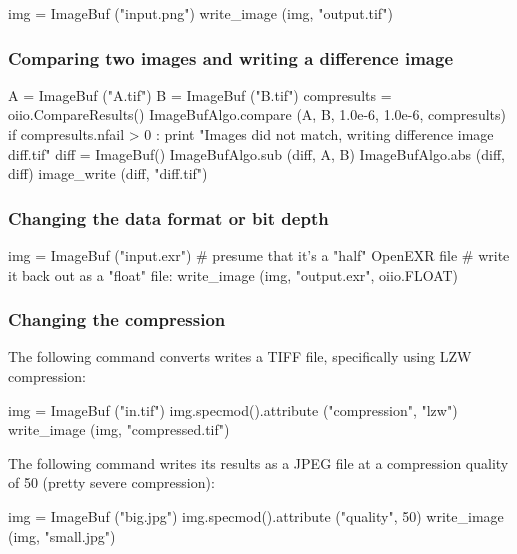 \begin{code}
    img = ImageBuf ("input.png")
    write_image (img, "output.tif")
\end{code}


\subsubsection*{Comparing two images and writing a difference image}

\begin{code}
    A = ImageBuf ("A.tif")
    B = ImageBuf ("B.tif")
    compresults = oiio.CompareResults()
    ImageBufAlgo.compare (A, B, 1.0e-6, 1.0e-6, compresults)
    if compresults.nfail > 0 :
        print "Images did not match, writing difference image diff.tif"
        diff = ImageBuf()
        ImageBufAlgo.sub (diff, A, B)
        ImageBufAlgo.abs (diff, diff)
        image_write (diff, "diff.tif")
\end{code}


\subsubsection*{Changing the data format or bit depth}

\begin{code}
    img = ImageBuf ("input.exr")
    # presume that it's a "half" OpenEXR file
    # write it back out as a "float" file:
    write_image (img, "output.exr", oiio.FLOAT)
\end{code}


\subsubsection*{Changing the compression}

The following command converts writes a TIFF file, specifically using
LZW compression:

\begin{code}
    img = ImageBuf ("in.tif")
    img.specmod().attribute ("compression", "lzw")
    write_image (img, "compressed.tif")
\end{code}

The following command writes its results as a JPEG file at a 
compression quality of 50 (pretty severe compression):

\begin{code}
    img = ImageBuf ("big.jpg")
    img.specmod().attribute ("quality", 50)
    write_image (img, "small.jpg")
\end{code}


